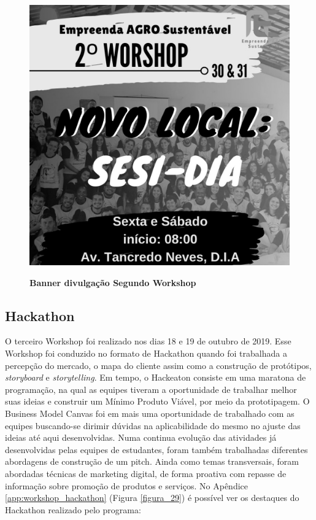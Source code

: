 \begin{figure}[H]
\centering
\caption{\textbf{Banner divulgação Segundo Workshop}}
\includegraphics[scale=0.2]{Imagens/2_workshop.jpg}
\label{fig:ods}
\end{figure}

\subsection{Hackathon}

O terceiro Workshop foi realizado nos dias 18 e 19 de outubro de 2019. Esse Workshop foi conduzido no formato de Hackathon quando foi trabalhada a percepção do mercado, o mapa do cliente assim como a construção de protótipos, \textit{storyboard} e \textit{storytelling}. Em tempo, o Hackeaton consiste em uma maratona de programação, na qual as equipes tiveram a oportunidade de trabalhar melhor suas ideias e construir um Mínimo Produto Viável, por meio da prototipagem. O Business Model Canvas foi em mais uma oportunidade de trabalhado com as equipes buscando-se dirimir dúvidas na aplicabilidade do mesmo no ajuste das ideias até aqui desenvolvidas.
Numa continua evolução das atividades já desenvolvidas pelas equipes de estudantes, foram também trabalhadas diferentes abordagens de construção de um pitch. Ainda como temas transversais, foram abordadas técnicas de marketing digital, de forma proativa com repasse de informação sobre promoção de produtos e serviços. No Apêndice \ref{app:workshop_hackathon} (Figura \ref{figura_29}) é possível ver os destaques do Hackathon realizado pelo programa:


